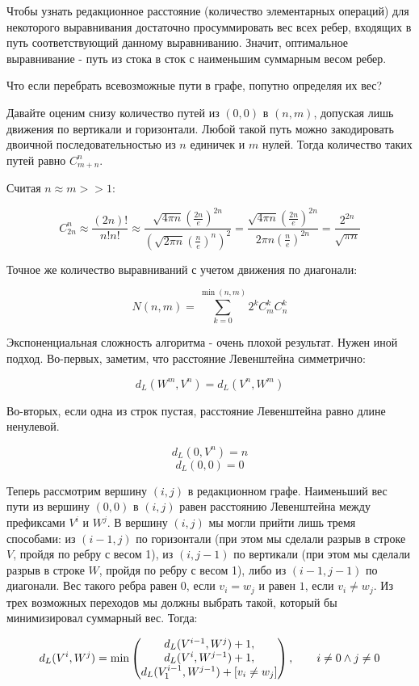 \documentclass[letterpaper, 11pt]{article}
\begin{document}
Чтобы узнать редакционное расстояние (количество элементарных операций) для некоторого выравнивания достаточно просуммировать вес всех ребер, входящих в путь соответствующий данному выравниванию. Значит, оптимальное выравнивание - путь из стока в сток с наименьшим суммарным весом ребер.

Что если перебрать всевозможные пути в графе, попутно определяя их вес?

Давайте оценим снизу количество путей из $(0,0)$ в $(n,m)$, допуская лишь движения по вертикали и горизонтали. Любой такой путь можно закодировать двоичной последовательностью из $n$ единичек и $m$ нулей. Тогда количество таких путей равно $C^n_{m+n}$.

Считая $n\approx m >> 1$:

$$C_{2n}^n \approx \frac{(2n)!}{n!n!}\approx
\frac{\sqrt{4\pi n} (\frac{2n}{e})^{2n}}
 {(\sqrt{2\pi n} (\frac{n}{e})^{n})^2}=
\frac{\sqrt{4\pi n} (\frac{2n}{e})^{2n}}
 {2\pi n(\frac{n}{e})^{2n}}=\frac{2^{2n}}{\sqrt{\pi n}}
$$

Точное же количество выравниваний с учетом движения по диагонали:

$$N(n,m)=\sum_{k=0}^{\min (n,m)}2^k C^k_m C^k_n$$

Экспоненциальная сложность алгоритма - очень плохой результат. Нужен иной подход. Во-первых, заметим, что расстояние Левенштейна симметрично:

$$d_L(W^m, V^n)=d_L(V^n, W^m)$$

Во-вторых, если одна из строк пустая, расстояние Левенштейна равно длине ненулевой.

$$d_L(0, V^n)=n$$
$$d_L(0, 0)=0$$


Теперь рассмотрим вершину $(i,j)$ в редакционном графе. Наименьший вес пути из вершину $(0,0)$ в $(i,j)$ равен расстоянию Левенштейна между префиксами $V^i$ и $W^j$. В вершину $(i,j)$ мы могли прийти лишь тремя способами: из $(i-1,j)$ по горизонтали (при этом мы сделали разрыв в строке $V$, пройдя по ребру с весом 1), из $(i,j-1)$ по вертикали (при этом мы сделали разрыв в строке $W$, пройдя по ребру с весом 1), либо из $(i-1,j-1)$ по диагонали. Вес такого ребра равен $0$, если $v_i=w_j$ и равен $1$, если $v_i\ne w_j$. Из трех возможных переходов мы должны выбрать такой, который бы минимизировал суммарный вес. Тогда:

$$d_L(V^i,W^j) = \min
	\begin{pmatrix} d_L(V^{i-1},W^j)+1, \\
	 d_L(V^{i},W^{j-1})+1, \\
	 d_L(V^{i-1}_1,W^{j-1})+[v_i\ne w_j]
	 \end{pmatrix},\quad \quad i\ne 0 \land j\ne 0\\
$$
\end{document}
